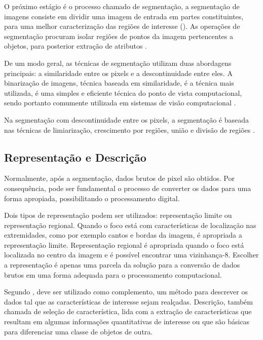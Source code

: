 O próximo estágio é o processo chamado de segmentação, a segmentação de imagens consiste em dividir uma imagem de entrada em partes
constituintes, para uma melhor caracterização das regiões de interesse (). As operações de segmentação procuram isolar regiões de pontos da imagem pertencentes a objetos, para
posterior extração de atributos \cite{Lourdes2010}.

De um modo geral, as técnicas de segmentação utilizam duas abordagens
principais: a similaridade entre os pixels e a descontinuidade entre eles. A binarização de imagens, técnica baseada em similaridade, é a técnica mais utilizada, é uma  simples e eficiente técnica do ponto de vista computacional, sendo portanto comumente utilizada em sistemas de visão computacional \cite{ISRAEL2003}.


Na segmentação com descontinuidade entre os pixels, a segmentação é baseada nas técnicas de limiarização, crescimento por regiões, união e divisão de regiões \cite{Rodrigues2002}.


\subsection{Representação e Descrição}

Normalmente, após a segmentação, dados brutos de pixel são obtidos. Por consequência, pode ser fundamental o processo de converter os dados para uma forma apropiada, possibilitando o processamento digital. 

Dois tipos de representação podem ser utilizados: representação limite ou representação regional. Quando o foco está com características de localização nas extremidades, como por exemplo cantos e bordas da imagem, é apropriada a representação limite. Representação regional é apropriada quando o foco está localizada no centro da imagem e é possível encontrar uma vizinhança-8. Escolher a representação é apenas uma parcela da solução para a conversão de dados brutos em uma forma adequada para o processamento computacional. \cite{Rodrigues2002}


Segundo , deve ser utilizado como complemento, um método para descrever os dados tal que as características de interesse sejam realçadas. Descrição, também chamada de seleção de característica, lida com a extração de características que resultam em algumas informações quantitativas de interesse ou que são básicas para diferenciar uma classe de objetos de outra.

